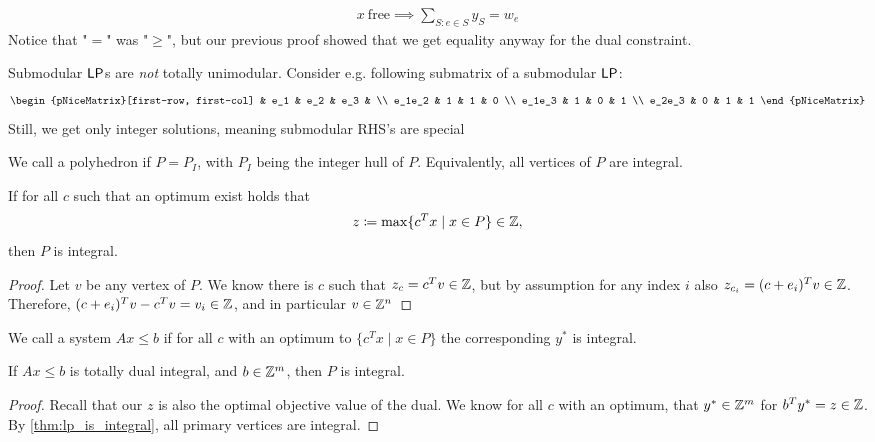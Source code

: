 \begin{align*}
    x\ \text{free} \implies \sum_{S:e \in S}y_S = w_e
\end{align*}
Notice that "$=$" was "$\geq$", but our previous proof showed that we
get equality anyway for the dual constraint.
\begin{remark}
    Submodular $\mathsf{LP}$s are \emph{not} totally unimodular.
    Consider e.g. following submatrix of a submodular $\mathsf{LP}$:
    \[
        \begin{pNiceMatrix}[first-row, first-col]
                   & e_1 & e_2 & e_3 & \\
            e_1e_2 & 1   & 1   & 0     \\
            e_1e_3 & 1   & 0   & 1     \\
            e_2e_3 & 0   & 1   & 1
        \end{pNiceMatrix}
    \]
    Still, we get only integer solutions, meaning submodular RHS's are special
\end{remark}
\begin{definition}
    We call a polyhedron  if $P=P_I$, with $P_I$ being the
    integer hull of $P$.
    Equivalently, all vertices of $P$ are integral.
\end{definition}
\begin{theorem} \label{thm:lp_is_integral}
    If for all $c$ such that an optimum exist holds that
    \begin{align*}
        z \coloneqq \max \{c^Tx \mid x \in P\} \in \mathbb{Z},
    \end{align*}
    then $P$ is integral.
\end{theorem}
\begin{proof}
    Let $v$ be any vertex of $P$. We know there is $c$ such that $z_c = c^Tv \in \mathbb{Z}$, but by assumption for any index $i$ also
    $z_{c_i}=(c+e_i)^Tv \in \mathbb{Z}$. Therefore, $(c+e_i)^Tv-c^Tv=v_i\in \mathbb{Z}$,
    and in particular $v \in \mathbb{Z}^n$
\end{proof}
\begin{definition}
    We call a system $Ax \leq b$  if for all $c$ with an optimum to $\{c^Tx \mid x \in P\}$
    the corresponding $y^*$ is integral.
\end{definition}
\begin{corollary}
    If $Ax \leq b$ is totally dual integral, and $b \in \mathbb{Z}^m$, then $P$ is integral.
\end{corollary}
\begin{proof}
    Recall that our $z$ is also the optimal objective value of the dual.
    We know for all $c$ with an optimum, that $y^* \in \mathbb{Z}^m$ for $b^Ty^* = z \in \mathbb{Z}$.
    By \autoref{thm:lp_is_integral}, all primary vertices are integral.
\end{proof}
